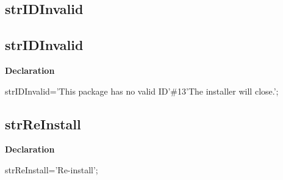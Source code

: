 \documentclass{report}
\newif\ifpdf
\begin{document}
\subsection*{\large{\textbf{strIDInvalid}}\normalsize\hspace{1ex}\hrulefill}
\else
\subsection*{strIDInvalid}
\fi
\label{trstrings-strIDInvalid}
\begin{list}{}{
\setlength{\itemindent}{0cm}
\setlength{\listparindent}{0cm}
\setlength{\leftmargin}{\evensidemargin}
\addtolength{\leftmargin}{\tmplength}
\settowidth{\labelsep}{X}
\addtolength{\leftmargin}{\labelsep}
\setlength{\labelwidth}{\tmplength}
}
\item[\textbf{Declaration}\hfill]
\ifpdf
\begin{flushleft}
\fi
\begin{ttfamily}
strIDInvalid='This package has no valid ID'{\#}13'The installer will close.';\end{ttfamily}

\ifpdf
\end{flushleft}
\fi

\end{list}
\ifpdf
\subsection*{\large{\textbf{strReInstall}}\normalsize\hspace{1ex}\hrulefill}
\else
\subsection*{strReInstall}
\fi
\label{trstrings-strReInstall}
\begin{list}{}{
\setlength{\itemindent}{0cm}
\setlength{\listparindent}{0cm}
\setlength{\leftmargin}{\evensidemargin}
\addtolength{\leftmargin}{\tmplength}
\settowidth{\labelsep}{X}
\addtolength{\leftmargin}{\labelsep}
\setlength{\labelwidth}{\tmplength}
}
\item[\textbf{Declaration}\hfill]
\ifpdf
\begin{flushleft}
\fi
\begin{ttfamily}
strReInstall='Re-install';\end{ttfamily}

\ifpdf
\end{flushleft}
\fi

\end{list}
\ifpdf
\end{document}
